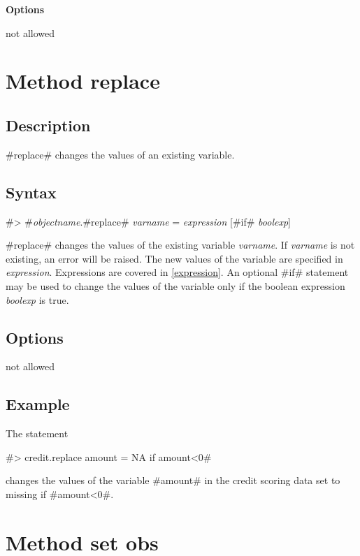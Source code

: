 \bigskip
{\bf Options}

not allowed



\section{Method replace}
\label{replace} 



\subsection*{Description}

#replace# changes the values of an existing variable.


\subsection*{Syntax}

#> #{\em objectname}.#replace# {\em varname} = {\em expression} [#if# {\em boolexp}]

#replace# changes the values of the existing variable {\em
varname}. If {\em varname} is not existing, an error will be
raised. The new values of the variable are specified in {\em
expression}. Expressions are covered in \autoref{expression}. An
optional #if# statement may be used to change the values of the
variable only if the boolean expression {\em boolexp} is true.


\subsection*{Options}

not allowed


\subsection*{Example}

The statement

#> credit.replace amount = NA if amount<0#

changes the values of the variable #amount# in the credit scoring
data set to missing if #amount<0#.


\section{Method set obs}
\label{setobs}


